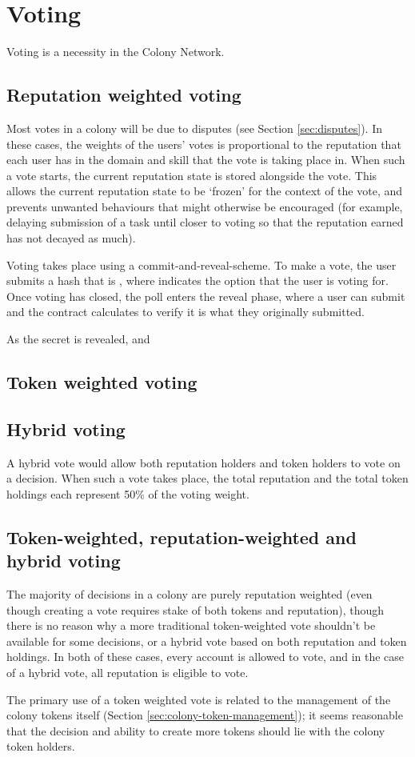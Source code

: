 \section{Voting}
Voting is a necessity in the Colony Network. 

\subsection{Reputation weighted voting}
Most votes in a colony will be due to disputes (see Section \ref{sec:disputes}). In these cases, the weights of the users' votes is proportional to the reputation that each user has in the domain and skill that the vote is taking place in. When such a vote starts, the current reputation state is stored alongside the vote. This allows the current reputation state to be `frozen' for the context of the vote, and prevents unwanted behaviours that might otherwise be encouraged (for example, delaying submission of a task until closer to voting so that the reputation earned has not decayed as much).

Voting takes place using a commit-and-reveal-scheme. To make a vote, the user submits a hash that is , where  indicates the option that the user is voting for. Once voting has closed, the poll enters the reveal phase, where a user can submit  and the contract calculates  to verify it is what they originally submitted.

As the secret is revealed, and 



\subsection{Token weighted voting}

\subsection{Hybrid voting}
A hybrid vote would allow both reputation holders and token holders to vote on a decision. When such a vote takes place, the total reputation and the total token holdings each represent 50\% of the voting weight.

\subsection{Token-weighted, reputation-weighted and hybrid voting}
The majority of decisions in a colony are purely reputation weighted (even though creating a vote requires stake of both tokens and reputation), though there is no reason why a more traditional token-weighted vote shouldn't be available for some decisions, or a hybrid vote based on both reputation and token holdings. In both of these cases, every account is allowed to vote, and in the case of a hybrid vote, all reputation is eligible to vote.

The primary use of a token weighted vote is related to the management of the colony tokens itself (Section \ref{sec:colony-token-management}); it seems reasonable that the decision and ability to create more tokens should lie with the colony token holders.